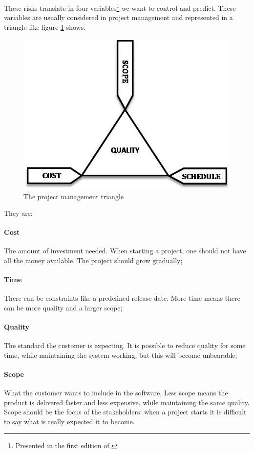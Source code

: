\documentclass[conference]{IEEEtran}
\begin{document}
These risks translate in four variables\footnote{Presented in the first edition of \cite{Beck:2004tc}} we want to control and predict. 
These variables are usually considered in project management and represented in a triangle like figure \ref{fig:triad} shows.

\begin{figure}
\centering
\includegraphics[width=0.7\linewidth]{The_triad_constraints.jpg}
\caption{The project management triangle\cite{pmtwiki}}
\label{fig:triad}
\end{figure}

They are:
\paragraph{Cost} The amount of investment needed. When starting a project, one should not have all the money available. The project should grow gradually;
\paragraph{Time} There can be constraints like a predefined release date. More time means there can be more quality and a larger scope;
\paragraph{Quality} The standard the customer is expecting. It is possible to reduce quality for some time, while maintaining the system working, but this will become unbearable;
\paragraph{Scope} What the customer wants to include in the software. Less scope means the product is delivered faster and less expensive, while maintaining the same quality. Scope should be the focus of the stakeholders: when a project starts it is difficult to say what is really expected it to become.
\end{document}

